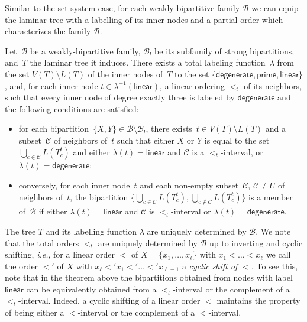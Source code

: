 \documentclass{lmcs} %
\newcommand*\defd[2][\em\color{red!25!black}]{{#1#2}}
\newcommand\DEGENERATE{\ensuremath{\mathsf{degenerate}}\xspace}
\newcommand\PRIME{\ensuremath{\mathsf{prime}}\xspace}
\newcommand\LINEAR{\ensuremath{\mathsf{linear}}\xspace}
\def\ie{{\em i.e.}}
\begin{document}
Similar to the set system case, for each weakly-bipartitive family $\mathcal{B}$ we can equip the laminar tree with a labelling of its inner nodes and a partial order which
characterizes the family $\mathcal{B}$.


\begin{thmC}\label{thm:weakly-bipartitive tree}
    Let~$\mathcal{B}$ be a weakly-bipartitive family,
    $\mathcal{B}_!$ be its subfamily of strong bipartitions,
    and~$T$ the laminar tree it induces.
    There exists a total labeling function~$\lambda$ from the set $V(T)\setminus L(T)$
    of the inner nodes of~$T$ to the set $\{\DEGENERATE,\PRIME,\LINEAR\}$, and, for each inner node $t\in \lambda^{-1}(\LINEAR)$, a linear ordering $<_{t}$ of its neighbors, such that every inner node of degree exactly three is labeled by $\DEGENERATE$ and the following conditions are satisfied:
    \begin{itemize}[nosep]
        \item for each bipartition~$\{X,Y\}\in\mathcal{B}\setminus\mathcal{B}_!$,
            there exists~$t\in V(T)\setminus L(T)$
            and a subset~$\mathcal{C}$ of neighbors of~$t$
            such that either $X$ or $Y$ is equal to the set
            $\bigcup_{c\in\mathcal{C}}L(T^t_c)$ and either $\lambda(t)=\LINEAR$ and $\mathcal{C}$ is a $<_t$-interval, or $\lambda(t)=\DEGENERATE$;
        \item conversely,
            for each inner node~$t$
            and each non-empty subset~$\mathcal{C}$, $\mathcal{C}\not= U$ of neighbors of~$t$,
            the bipartition
            $\big\{\bigcup_{c\in\mathcal{C}}L(T^t_c),\bigcup_{c\notin\mathcal{C}}L(T^t_c)\big\}$ is a member of~$\mathcal{B}$ if either $\lambda(t)=\LINEAR$ and $\mathcal{C}$ is $<_t$-interval or $\lambda(t)=\DEGENERATE$.
    \end{itemize}
\end{thmC}
The tree $T$ and its labelling function $\lambda$ are uniquely determined by $\mathcal{B}$. We note that the total orders $<_t$ are uniquely determined by
$\mathcal{B}$ up to inverting and cyclic shifting, \ie, for a linear order $<$ of $X=\{x_1,\dots,x_\ell\}$ with $x_1<\dots<x_\ell$ we call the order $<'$ of $X$
with $x_\ell<'x_1<'\dots<' x_{\ell-1}$ a \defd{cyclic shift of $<$}. To see this, note that in the theorem above the bipartitions obtained from nodes with label
$\LINEAR$ can be equivalently obtained from a $<_t$-interval or the complement of a $<_t$-interval. Indeed, a cyclic shifting of a linear order $<$ maintains the property of being either a $<$-interval or the complement of a $<$-interval.
\end{document}
